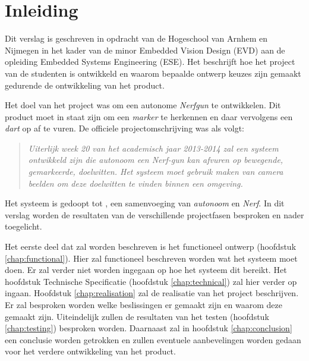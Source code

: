 \chapter{Inleiding}
\label{chap:introduction}

%

Dit verslag is geschreven in opdracht van de Hogeschool van Arnhem en Nijmegen
in het kader van de minor Embedded Vision Design (EVD) aan de opleiding Embedded
Systems Engineering (ESE). Het beschrijft hoe het project van de studenten is
ontwikkeld en waarom bepaalde ontwerp keuzes zijn gemaakt gedurende de
ontwikkeling van het product.

Het doel van het project was om een autonome \emph{Nerfgun} te ontwikkelen. Dit
product moet in staat zijn om een \emph{marker} te herkennen en daar vervolgens
een \emph{dart} op af te vuren. De officiele projectomschrijving was als volgt:

\begin{quotation}
\emph{Uiterlijk week 20 van het academisch jaar 2013-2014 zal een systeem
ontwikkeld zijn die autonoom een Nerf-gun kan afvuren op bewegende, gemarkeerde,
doelwitten. Het systeem moet gebruik maken van camera beelden om deze doelwitten
te vinden binnen een omgeving.}
\end{quotation}

Het systeem is gedoopt tot \textbf{\autonerf}, een samenvoeging van \emph{autonoom}
en \emph{Nerf}. In dit verslag worden de resultaten van de verschillende
projectfasen besproken en nader toegelicht.

Het eerste deel dat zal worden beschreven is het functioneel ontwerp (hoofdstuk
\ref{chap:functional}). Hier zal functioneel beschreven worden wat het systeem
moet doen. Er zal verder niet worden ingegaan op hoe het systeem dit bereikt.
Het hoofdstuk Technische Specificatie (hoofdstuk \ref{chap:technical}) zal hier
verder op ingaan. Hoofdstuk \ref{chap:realisation} zal de realisatie van het
project beschrijven. Er zal besproken worden welke beslissingen er gemaakt zijn
en waarom deze gemaakt zijn. Uiteindelijk zullen de resultaten van het testen
(hoofdstuk \ref{chap:testing}) besproken worden. Daarnaast zal in hoofdstuk
\ref{chap:conclusion} een conclusie worden getrokken en zullen eventuele
aanbevelingen worden gedaan voor het verdere ontwikkeling van het product.
